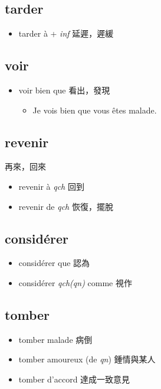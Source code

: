 \documentclass{book}
\begin{document}
        \subsection{tarder}
            \begin{itemize}
                \item tarder à + \textit{inf} 延遲，遲緩
            \end{itemize}

        \subsection{voir}
            \begin{itemize}
                \item voir bien que 看出，發現
                    \begin{itemize}
                        \item Je vois bien que vous êtes malade. 
                    \end{itemize}
            \end{itemize}

        \subsection{revenir}
            再來，回來
            \begin{itemize}
                \item revenir à \textit{qch} 回到
                \item revenir de \textit{qch} 恢復，擺脫
            \end{itemize}

        \subsection{considérer}
            \begin{itemize}
                \item considérer que 認為
                \item considérer \textit{qch(qn)} comme 視作
            \end{itemize}

        \subsection{tomber}
            \begin{itemize}
                \item tomber malade 病倒
                \item tomber amoureux (de \textit{qn}) 鍾情與某人
                \item tomber d'accord 達成一致意見
            \end{itemize}
        
\end{document}

